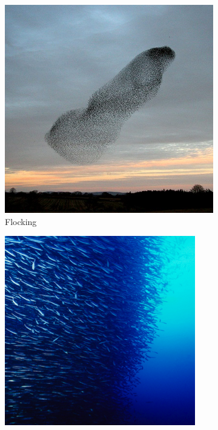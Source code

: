 \begin{figure}[H]
	\centering
	\begin{subfigure}[b]{0.31\textwidth}
		\label{fig:flocking}
		\centering
		\includegraphics[height=\linewidth]{chapters/res/flocking_edit.jpg}
		\caption{Flocking\cite{baxter_flocking.jpg_2008}}
	\end{subfigure}
	\begin{subfigure}[b]{0.31\textwidth}
		\label{fig:scholing}
		\centering
		\includegraphics[height=\linewidth]{chapters/res/schooling_edit.png}

\end{subfigure}
\end{figure}
